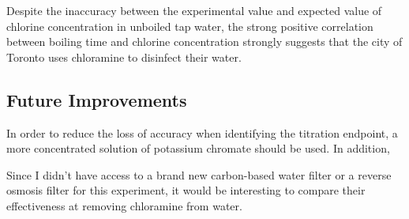 \documentclass[11pt]{article}
\begin{document}
Despite the inaccuracy between the experimental value and expected value of chlorine concentration in unboiled tap water, the strong positive correlation between boiling time and chlorine concentration strongly suggests that the city of Toronto uses chloramine to disinfect their water.

\subsection{Future Improvements}

In order to reduce the loss of accuracy when identifying the titration endpoint, a more concentrated solution of potassium chromate should be used. In addition,

Since I didn't have access to a brand new carbon-based water filter or a reverse osmosis filter for this experiment, it would be interesting to compare their effectiveness at removing chloramine from water.
\end{document}
